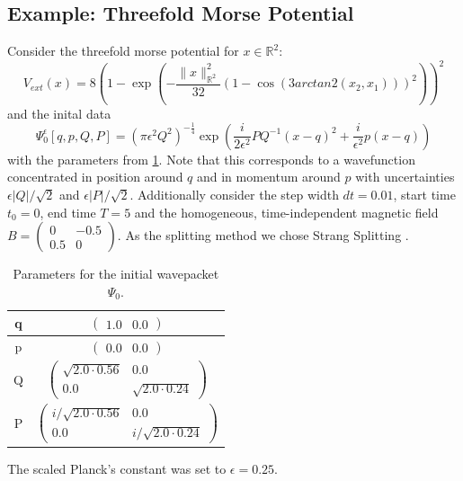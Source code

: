 \documentclass[11pt, a4paper, oneside]{article}
\begin{document}
\subsection{Example: Threefold Morse Potential}
Consider the threefold morse potential for $x \in \mathbb{R}^2$:
\begin{equation*}
  V_{ext}(x) = 8 \left(1 - \exp\left( - \frac{\lVert x \rVert _{\mathbb{R}^2}^2}{32}(1 - \cos(3arctan2(x_2, x_1)))^2\right)\right)^2
\end{equation*}
and the inital data
\begin{equation*}
  \Psi_0^{\epsilon}[q, p, Q, P] = \left( \pi \epsilon^2 Q^2 \right)^{-\frac{1}{4}} \exp \left( \frac{i}{2\epsilon^2} PQ^{-1}(x-q)^2 + \frac{i}{\epsilon^2}p(x-q) \right)
\end{equation*}
 with the parameters from \cref{tab:params}. Note that this corresponds to a wavefunction concentrated in position around $q$ and in momentum around $p$ with uncertainties $\epsilon \lvert Q \rvert / \sqrt{2}$ and $\epsilon \lvert P \rvert / \sqrt{2}$. Additionally consider the step width $dt=0.01$, start time $t_0=0$, end time $T=5$ and the homogeneous, time-independent magnetic field $B = \begin{pmatrix} 0 & -0.5 \\ 0.5 & 0 \end{pmatrix}$. As the splitting method we chose Strang Splitting .
\begin{table}[h]
  \centering
  \begin{tabular}{c|c}
    q & $\begin{pmatrix}1.0 & 0.0 \end{pmatrix}$ \\ \hline
    p & $\begin{pmatrix}0.0 & 0.0 \end{pmatrix}$ \\ \hline
    Q & $\begin{pmatrix}
      \sqrt{2.0 \cdot 0.56} & 0.0 \\
      0.0 & \sqrt{2.0 \cdot 0.24}
    \end{pmatrix}$ \\ \hline
    P & $\begin{pmatrix}
      i/\sqrt{2.0 \cdot 0.56} & 0.0 \\
      0.0 & i/\sqrt{2.0 \cdot 0.24}
    \end{pmatrix}$ \\
  \end{tabular}
  \caption{Parameters for the initial wavepacket $\Psi_0$.}
  \label{tab:params}

\end{table}
The scaled Planck's constant was set to $\epsilon = 0.25$.
\end{document}
